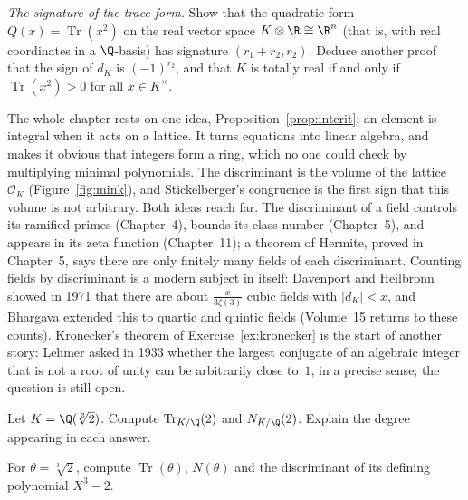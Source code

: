 \begin{exercise}[$\star\star\star$]\label{ex:traceform}
\emph{The signature of the trace form.} Show that the quadratic form $Q(x)=\operatorname{Tr}(x^2)$ on the real vector
space $K\otimes\R\cong\R^n$ (that is, with real coordinates in a $\Q$-basis) has signature $(r_1+r_2,r_2)$. Deduce
another proof that the sign of $d_K$ is $(-1)^{r_2}$, and that $K$ is totally real if and only if $\operatorname{Tr}(x^2)>0$
for all $x\in K^\times$.
\end{exercise}

\begin{beauty}
The whole chapter rests on one idea, Proposition~\ref{prop:intcrit}: an element is integral when it acts on a lattice.
It turns equations into linear algebra, and makes it obvious that integers form a ring, which no one could check by
multiplying minimal polynomials. The discriminant is the volume of the lattice $\mathcal O_K$ (Figure~\ref{fig:mink}),
and Stickelberger's congruence is the first sign that this volume is not arbitrary. Both ideas reach far. The
discriminant of a field controls its ramified primes (Chapter~4), bounds its class number (Chapter~5), and appears in
its zeta function (Chapter~11); a theorem of Hermite, proved in Chapter~5, says there are only finitely many fields of each discriminant.
Counting fields by discriminant is a modern subject in itself: Davenport and Heilbronn showed in 1971 that there are
about $\frac{x}{3\zeta(3)}$ cubic fields with $|d_K|<x$, and Bhargava extended this to quartic and quintic fields
(Volume~15 returns to these counts). Kronecker's theorem of Exercise~\ref{ex:kronecker} is the start of another story:
Lehmer asked in 1933 whether the largest conjugate of an algebraic integer that is not a root of unity can be
arbitrarily close to~$1$, in a precise sense; the question is still open.
\end{beauty}

\begin{exercise}[$\star$]\label{ex:v13-extra-03-1}
Let $K=\Q(\sqrt[3]2)$. Compute $\operatorname{Tr}_{K/\Q}(2)$ and $N_{K/\Q}(2)$. Explain the degree appearing in each answer.
\end{exercise}

\begin{exercise}[$\star$]\label{ex:v13-extra-03-2}
For $\theta=\sqrt[3]2$, compute $\operatorname{Tr}(\theta)$, $N(\theta)$ and the discriminant of its defining polynomial $X^3-2$.
\end{exercise}

